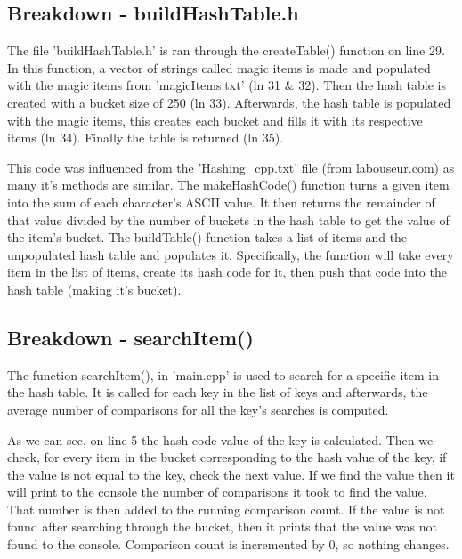 \documentclass[12pt, letterpaper]{article}
\begin{document}
\subsection{Breakdown - buildHashTable.h} \label{BldHshTbl}
The file 'buildHashTable.h' is ran through the createTable() function on line 29.
In this function, a vector of strings called magic items is made and populated with the magic items from 'magicItems.txt' (ln 31 \& 32).
Then the hash table is created with a bucket size of 250 (ln 33). 
Afterwards, the hash table is populated with the magic items, this creates each bucket and fills it with its respective items (ln 34).
Finally the table is returned (ln 35).

This code was influenced from the 'Hashing\_cpp.txt' file (from labouseur.com) as many it's methods are similar.
The makeHashCode() function turns a given item into the sum of each character's ASCII value.
It then returns the remainder of that value divided by the number of buckets in the hash table to get the value of the item's bucket.
\newline
\indent The buildTable() function takes a list of items and the unpopulated hash table and populates it.
Specifically, the function will take every item in the list of items, create its hash code for it, then push that code into the hash table (making it's bucket).

\subsection{Breakdown - searchItem()} \label{HshSchCde}
The function searchItem(), in 'main.cpp' is used to search for a specific item in the hash table.
It is called for each key in the list of keys and afterwards, the average number of comparisons for all the key's searches is computed.

As we can see, on line 5 the hash code value of the key is calculated.
Then we check, for every item in the bucket corresponding to the hash value of the key, if the value is not equal to the key, check the next value.
\newline
\indent If we find the value then it will print to the console the number of comparisons it took to find the value.
That number is then added to the running comparison count. 
If the value is not found after searching through the bucket, then it prints that the value was not found to the console.
Comparison count is incremented by 0, so nothing changes.
\end{document}
